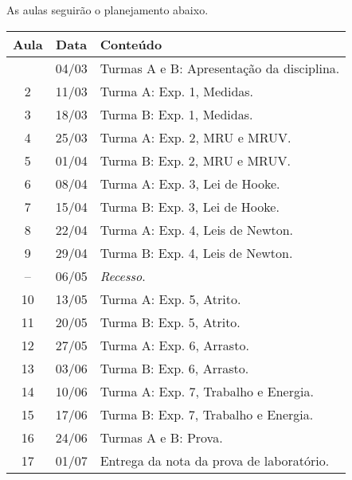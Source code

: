 As aulas seguirão o planejamento abaixo.
\begin{center}
\begin{longtable}{ccp{70mm}}
\toprule
Aula & Data & Conteúdo \\
\midrule
\endhead
\bottomrule
\endfoot
 1 & 04/03 & Turmas A e B: Apresentação da disciplina. \\
 2 & 11/03 & Turma A: Exp. 1, Medidas. \\
 3 & 18/03 & Turma B: Exp. 1, Medidas. \\
 4 & 25/03 & Turma A: Exp. 2, MRU e MRUV. \\ 
 5 & 01/04 & Turma B: Exp. 2, MRU e MRUV. \\
 6 & 08/04 & Turma A: Exp. 3, Lei de Hooke. \\
 7 & 15/04 & Turma B: Exp. 3, Lei de Hooke. \\
 8 & 22/04 & Turma A: Exp. 4, Leis de Newton. \\
 9 & 29/04 & Turma B: Exp. 4, Leis de Newton. \\
-- & 06/05 & \emph{Recesso}. \\
10 & 13/05 & Turma A: Exp. 5, Atrito. \\
11 & 20/05 & Turma B: Exp. 5, Atrito. \\
12 & 27/05 & Turma A: Exp. 6, Arrasto. \\
13 & 03/06 & Turma B: Exp. 6, Arrasto. \\
14 & 10/06 & Turma A: Exp. 7, Trabalho e Energia. \\
15 & 17/06 & Turma B: Exp. 7, Trabalho e Energia. \\
16 & 24/06 & Turmas A e B: Prova. \\
17 & 01/07 & Entrega da nota da prova de laboratório. \\
\end{longtable}
\end{center}

\cleardoublepage
